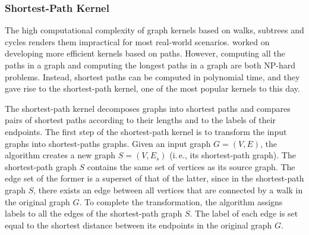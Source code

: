 \documentclass[twoside,11pt]{article}
\newcommand{\ie}{i.\,e., }
\begin{document}
\subsubsection{Shortest-Path Kernel}
The high computational complexity of graph kernels based on walks, subtrees and cycles renders them impractical for most real-world scenarios.
 worked on developing more efficient kernels based on paths.
However, computing all the paths in a graph and computing the longest paths in a graph are both NP-hard problems.
Instead, shortest paths can be computed in polynomial time, and they gave rise to the shortest-path kernel, one of the most popular kernels to this day.

The shortest-path kernel decomposes graphs into shortest paths and compares pairs of shortest paths according to their lengths and to the labels of their endpoints.
The first step of the shortest-path kernel is to transform the input graphs into shortest-paths graphs.
Given an input graph $G=(V,E)$, the algorithm creates a new graph $S=(V,E_s)$ (\ie its shortest-path graph).
The shortest-path graph $S$ contains the same set of vertices as its source graph.
The edge set of the former is a superset of that of the latter, since in the shortest-path graph $S$, there exists an edge between all vertices that are connected by a walk in the original graph $G$.
To complete the transformation, the algorithm assigns labels to all the edges of the shortest-path graph $S$.
The label of each edge is set equal to the shortest distance between its endpoints in the original graph $G$.
\end{document}
